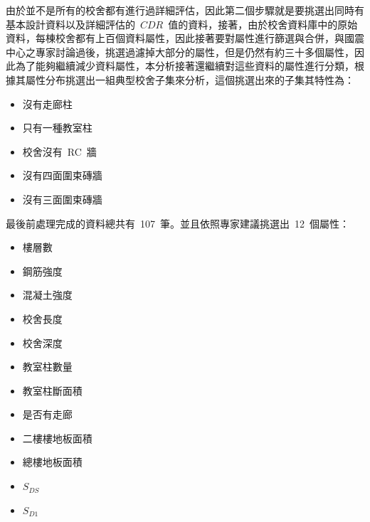 由於並不是所有的校舍都有進行過詳細評估，因此第二個步驟就是要挑選出同時有基本設計資料以及詳細評估的~$CDR$~值的資料，接著，由於校舍資料庫中的原始資料，每棟校舍都有上百個資料屬性，因此接著要對屬性進行篩選與合併，與國震中心之專家討論過後，挑選過濾掉大部分的屬性，但是仍然有約三十多個屬性，因此為了能夠繼續減少資料屬性，本分析接著還繼續對這些資料的屬性進行分類，根據其屬性分布挑選出一組典型校舍子集來分析，這個挑選出來的子集其特性為：


\begin{itemize}
\item 沒有走廊柱
\item 只有一種教室柱
\item 校舍沒有~RC~牆
\item 沒有四面圍束磚牆
\item 沒有三面圍束磚牆
\end{itemize}

最後前處理完成的資料總共有~107~筆。並且依照專家建議挑選出~12~個屬性：

\begin{multicols}{2}
\begin{itemize}
\item 樓層數
\item 鋼筋強度
\item 混凝土強度
\item 校舍長度
\item 校舍深度
\item 教室柱數量
\item 教室柱斷面積
\item 是否有走廊
\item 二樓樓地板面積
\item 總樓地板面積
\item $S_{DS}$
\item $S_{D1}$
\end{itemize}
\end{multicols}

